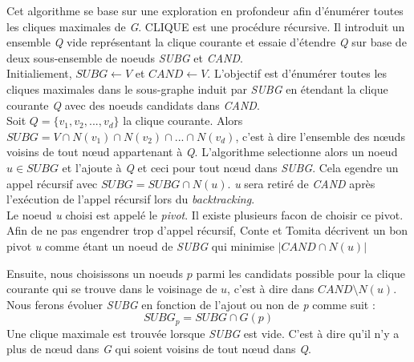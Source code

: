 \documentclass[a4paper, 12pt]{article}
\begin{document}
Cet algorithme se base sur une exploration en profondeur afin d'énumérer toutes les cliques maximales de \emph{G}.
CLIQUE est une procédure récursive. Il introduit un ensemble \emph{Q} vide représentant la clique courante et essaie d'étendre \emph{Q} sur base de deux sous-ensemble de noeuds \textit{SUBG} et \textit{CAND}.\\

Initialiement, $ SUBG \leftarrow V $ et $ CAND \leftarrow V $. L'objectif est d'énumérer toutes les cliques maximales dans le sous-graphe induit par \emph{SUBG} en étendant la clique courante \emph{Q} avec des noeuds candidats dans \emph{CAND}. \\

Soit $ Q = \{v_1, v_2, ..., v_d\} $ la clique courante.
Alors $ SUBG = V \cap N(v_1) \cap N(v_2) \cap ... \cap N(v_d)$, c'est à dire l'ensemble des nœuds voisins de tout nœud appartenant à \emph{Q}. L'algorithme selectionne alors  un noeud $ u \in SUBG $ et l'ajoute à \emph{Q} et ceci pour tout nœud dans \emph{SUBG}. Cela egendre un appel récursif avec $ SUBG = SUBG \cap N(u) $. \emph{u} sera retiré de \emph{CAND} après l'exécution de l'appel récursif lors du \textit{backtracking}. \\

Le noeud \emph{u} choisi est appelé le \textit{pivot}. Il existe
plusieurs facon de choisir ce pivot. Afin de ne pas engendrer trop
d'appel récursif, Conte et Tomita\cite{contetomita} décrivent un bon
pivot \emph{u} comme étant un noeud de \emph{SUBG} qui minimise
$ | CAND \cap N(u) |$


Ensuite, nous choisissons un noeuds $ p $ parmi les candidats possible
pour la clique courante qui se trouve dans le voisinage de $ u $,
c'est à dire dans $ CAND \setminus N(u) $.\\
Nous ferons évoluer \emph{SUBG} en fonction de l'ajout ou non de \emph{p} comme suit : $$ SUBG_p = SUBG \cap G(p) $$ Une clique maximale est trouvée lorsque \emph{SUBG} est vide. C'est à dire qu'il n'y a plus de nœud dans \emph{G} qui soient voisins de tout nœud dans \emph{Q}. \\
\end{document}
